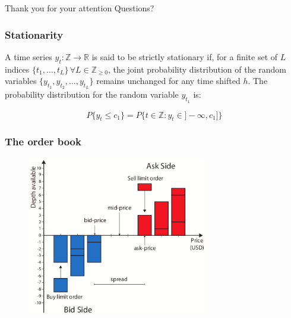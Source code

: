 \documentclass{beamer}
\def\R{{\mathbb R }}
\def\Z{{\mathbb Z }}
\begin{document}
\begin{frame}[plain,c]
\begin{center}
\Huge Thank you for your attention
\Huge Questions?
\end{center}
\end{frame}



%





\appendix

\begin{frame}
\frametitle{Stationarity}
A time series $y_t: \Z \to \R $ is said to be strictly stationary if, for a finite set of $L$ indices $\{t_{1},\dots,t_{L}\}  \, \forall L \in \Z_{\ge 0}$, the joint probability distribution of the random variables $\{y_{t_{1}},y_{t_{2}},\dots,y_{t_{L}}\}$ remains unchanged for any time shifted $h$.
The probability distribution for the random variable $y_{t_1}$ is:

\begin{equation}
P\{y_{t} \leq c_1 \} = P\{t \in \Z:  y_t \in  ]-\infty, c_1] \} 
\end{equation}


\end{frame}

\begin{frame}
\frametitle{The order book}
\begin{figure}
\includegraphics[width=0.7\textwidth]{img/orderbook}
\end{figure}
\end{frame}
\end{document}
